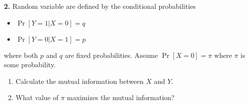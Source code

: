 \textbf{2.} Random variable are defined by the conditional probabilities
\begin{itemize}
\item  $\Pr[Y=1 | X=0] =q$
\item  $\Pr[Y=0 | X=1]=p$
\end{itemize}
where both $p$ and $q$ are fixed probabilities.
Assume $\Pr [X=0] =\pi $ where $\pi$ is some probability.
\begin{enumerate}
\item Calculate the mutual information between $X$ and $Y$.
\item What value of $\pi$ maximizes the mutual information?
\end{enumerate}

